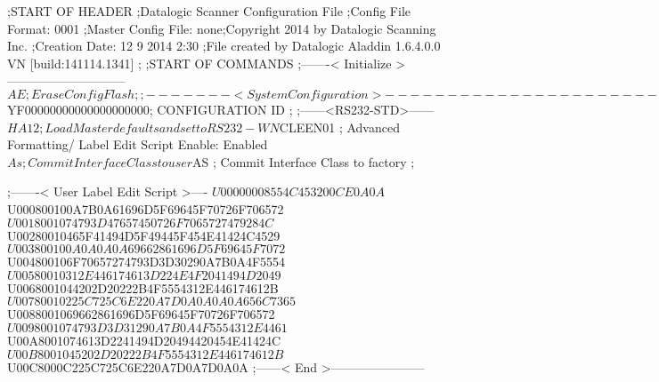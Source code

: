 ;START OF HEADER
;Datalogic Scanner Configuration File
;Config File Format: 0001
;Master Config File: none;Copyright 2014 by Datalogic Scanning Inc.
;Creation Date: 12 9 2014 2:30
;File created by Datalogic Aladdin 1.6.4.0.0 VN [build:141114.1341]
;
;START OF COMMANDS
;-------< Initialize >-----------------------------
$AE                 ; Erase Config Flash
;
;-------< System Configuration >-------------------------------
$YF00000000000000000000; CONFIGURATION ID
;
;------<RS232-STD>------
$HA12               ; Load Master defaults and set to RS232-WN
$CLEEN01            ; Advanced Formatting/ Label Edit Script Enable: Enabled
$As                 ; Commit Interface Class to user
$AS                 ; Commit Interface Class to factory
;

;-------< User Label Edit Script >----
$U00000008554C453200CE0A0A
$U000800100A7B0A61696D5F69645F70726F706572
$U0018001074793D47657450726F7065727479284C
$U00280010465F41494D5F49445F454E41424C4529
$U003800100A0A0A0A69662861696D5F69645F7072
$U004800106F70657274793D3D30290A7B0A4F5554
$U00580010312E446174613D224E4F2041494D2049
$U0068001044202D20222B4F5554312E446174612B
$U00780010225C725C6E220A7D0A0A0A0A656C7365
$U0088001069662861696D5F69645F70726F706572
$U0098001074793D3D31290A7B0A4F5554312E4461
$U00A8001074613D2241494D20494420454E41424C
$U00B8001045202D20222B4F5554312E446174612B
$U00C8000C225C725C6E220A7D0A7D0A0A
;------< End >-----------------------
